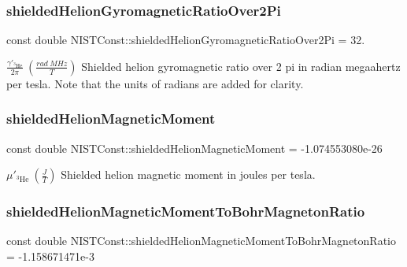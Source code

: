 \subsubsection{\texorpdfstring{shielded\+Helion\+Gyromagnetic\+Ratio\+Over2\+Pi}{shieldedHelionGyromagneticRatioOver2Pi}}
{\footnotesize\ttfamily const double N\+I\+S\+T\+Const\+::shielded\+Helion\+Gyromagnetic\+Ratio\+Over2\+Pi = 32.}

$\frac{\gamma'_{^3\textrm{He}}}{2 \pi} \ (\frac{rad\ MHz}{T})$ Shielded helion gyromagnetic ratio over 2 pi in radian megaahertz per tesla. Note that the units of radians are added for clarity. \mbox{\label{group___n_i_s_t_const-_helion_ga1b0f92c14390afe726af4005e21c2ae8}} 
\subsubsection{\texorpdfstring{shielded\+Helion\+Magnetic\+Moment}{shieldedHelionMagneticMoment}}
{\footnotesize\ttfamily const double N\+I\+S\+T\+Const\+::shielded\+Helion\+Magnetic\+Moment = -\/1.\+074553080e-\/26}

$\mu'_{^3\textrm{He}} \ (\frac{J}{T})$ Shielded helion magnetic moment in joules per tesla. \mbox{\label{group___n_i_s_t_const-_helion_gac48304d45406c207fbadeca604d5c71a}} 
\subsubsection{\texorpdfstring{shielded\+Helion\+Magnetic\+Moment\+To\+Bohr\+Magneton\+Ratio}{shieldedHelionMagneticMomentToBohrMagnetonRatio}}
{\footnotesize\ttfamily const double N\+I\+S\+T\+Const\+::shielded\+Helion\+Magnetic\+Moment\+To\+Bohr\+Magneton\+Ratio = -\/1.\+158671471e-\/3}

